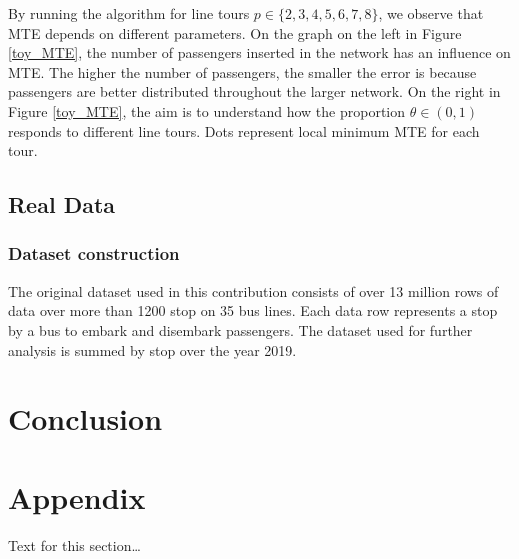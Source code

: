 \documentclass{bmcart}
\begin{document}
By running the algorithm for line tours $p \in \{2,3,4,5,6,7,8\}$, we observe that MTE depends on different parameters. On the graph on the left in Figure \ref{toy_MTE}, the number of passengers inserted in the network has an influence on MTE. The higher the number of passengers, the smaller the error is because passengers are better distributed throughout the larger network. On the right in Figure \ref{toy_MTE}, the aim is to understand how the proportion $\theta\in (0,1)$ responds to different line tours. Dots represent local minimum MTE for each tour.

\subsection{Real Data}
\subsubsection{Dataset construction}
The original dataset used in this contribution consists of over 13 million rows of data over more than 1200 stop on 35 bus lines. Each data row represents a stop by a bus to embark and disembark passengers. The dataset used for further analysis is summed by stop over the year 2019.


\section{Conclusion}

  
\newpage


\section*{Appendix}
Text for this section\ldots

\end{document}
